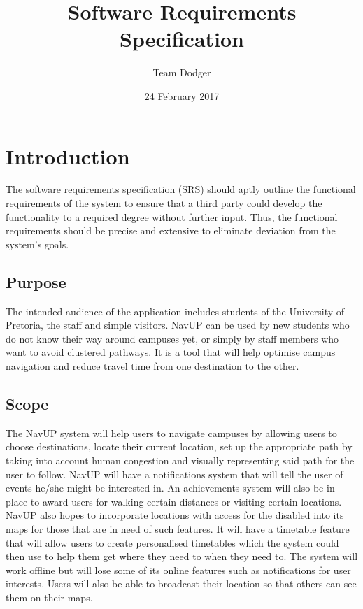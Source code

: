 \documentclass{article}
\title{Software Requirements Specification}
\date{24 February 2017}
\author{Team Dodger}
\begin{document}
	\maketitle
	\newpage
	\tableofcontents
	\newpage
	
	\section{Introduction}
	The software requirements specification (SRS) should aptly outline the functional requirements of the system to ensure that a third party could develop the functionality to a required degree without further input. Thus, the functional requirements should be precise and extensive to eliminate deviation from the system’s goals.
	
	\subsection{Purpose}
	The intended audience of the application includes students of the University of Pretoria, the staff and simple visitors. NavUP can be used by new students who do not know their way around campuses yet, or simply by staff members who want to avoid clustered pathways. It is a tool that will help optimise campus navigation and reduce travel time from one destination to the other.
	
	\subsection{Scope}
	The NavUP system will help users to navigate campuses by allowing users to choose destinations, locate their current location, set up the appropriate path by taking into account human congestion and visually representing said path for the user to follow.
	NavUP will have a notifications system that will tell the user of events he/she might be interested in. An achievements system will also be in place to award users for walking certain distances or visiting certain locations.  NavUP also hopes to incorporate locations with access for the disabled into its maps for those that are in need of such features. It will have a timetable feature that will allow users to create personalised timetables which the system could then use to help them get where they need to when they need to. The system will work offline but will lose some of its online features such as notifications for user interests. Users will also be able to broadcast their location so that others can see them on their maps.
	
\end{document}

